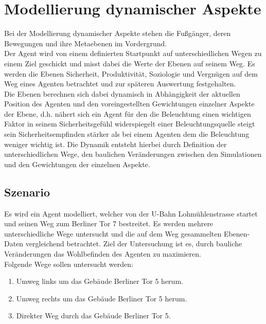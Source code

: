 \documentclass[10pt]{scrartcl}
\author{André Harms, Oliver Steenbuck, Armin Steudte  \\ Carsten Noetzel, Dennis Blauhut, Torben Becker}
\title{\titletext}
\date{16.11.2011}
\begin{document}
\maketitle

\setcounter{tocdepth}{3}
\tableofcontents

	\listoftables                                 												%
	\listoffigures   

\section{Modellierung dynamischer Aspekte}
Bei der Modellierung dynamischer Aspekte stehen die Fußgänger, deren Bewegungen und ihre Metaebenen im Vordergrund.\\
Der Agent wird von einem definierten Startpunkt auf unterschiedlichen Wegen zu einem Ziel geschickt und misst dabei die Werte der Ebenen auf seinem Weg. Es werden die Ebenen Sicherheit, Produktivität, Soziologie und Vergnügen auf dem Weg eines Agenten betrachtet und zur späteren Auswertung festgehalten.\\
Die Ebenen berechnen sich dabei dynamisch in Abhängigkeit der aktuellen Position des Agenten und den voreingestellten Gewichtungen einzelner Aspekte der Ebene, d.h. nähert sich ein Agent für den die Beleuchtung einen wichtigen Faktor in seinem Sicherheitsgefühl widerspiegelt einer Beleuchtungsquelle steigt sein Sicherheitsempfinden stärker als bei einem Agenten dem die Beleuchtung weniger wichtig ist. Die Dynamik entsteht hierbei durch Definition der unterschiedlichen Wege, den baulichen Veränderungen zwischen den Simulationen und den Gewichtungen der einzelnen Aspekte.

\subsection{Szenario}
Es wird ein Agent modelliert, welcher von der U-Bahn Lohmühlenstrasse startet und seinen Weg zum Berliner Tor 7 bestreitet. Es werden mehrere unterschiedliche Wege untersucht und die auf dem Weg gesammelten Ebenen-Daten vergleichend betrachtet. Ziel der Untersuchung ist es, durch bauliche Veränderungen das Wohlbefinden des Agenten zu maximieren.\\

Folgende Wege sollen untersucht werden:

\begin{enumerate}
\item Umweg links um das Gebäude Berliner Tor 5 herum.
\item Umweg rechts um das Gebäude Berliner Tor 5 herum.
\item Direkter Weg durch das Gebäude Berliner Tor 5.
\end{enumerate}
\end{document}
